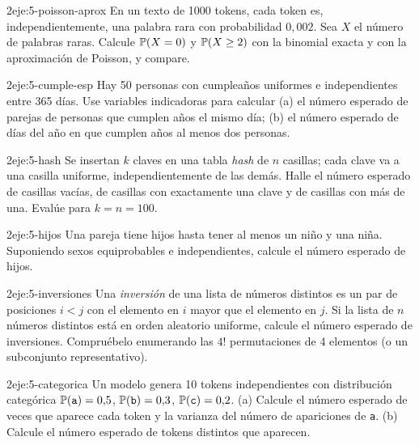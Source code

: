 \begin{ejercicio}{2}{eje:5-poisson-aprox}
En un texto de 1000 tokens, cada token es, independientemente, una palabra rara con probabilidad $0{,}002$. Sea $X$ el número de palabras raras. Calcule $\mathbb{P}(X=0)$ y $\mathbb{P}(X\ge2)$ con la binomial exacta y con la aproximación de Poisson, y compare.
\end{ejercicio}

\begin{ejercicio}{2}{eje:5-cumple-esp}
Hay 50 personas con cumpleaños uniformes e independientes entre 365 días. Use variables indicadoras para calcular (a) el número esperado de parejas de personas que cumplen años el mismo día; (b) el número esperado de días del año en que cumplen años al menos dos personas.
\end{ejercicio}

\begin{ejercicio}{2}{eje:5-hash}
Se insertan $k$ claves en una tabla \emph{hash} de $n$ casillas; cada clave va a una casilla uniforme, independientemente de las demás. Halle el número esperado de casillas vacías, de casillas con exactamente una clave y de casillas con más de una. Evalúe para $k=n=100$.
\end{ejercicio}

\begin{ejercicio}{2}{eje:5-hijos}
Una pareja tiene hijos hasta tener al menos un niño y una niña. Suponiendo sexos equiprobables e independientes, calcule el número esperado de hijos.
\end{ejercicio}

\begin{ejercicio}{2}{eje:5-inversiones}
Una \emph{inversión} de una lista de números distintos es un par de posiciones $i<j$ con el elemento en $i$ mayor que el elemento en $j$. Si la lista de $n$ números distintos está en orden aleatorio uniforme, calcule el número esperado de inversiones. Compruébelo enumerando las $4!$ permutaciones de 4 elementos (o un subconjunto representativo).
\end{ejercicio}

\begin{ejercicio}{2}{eje:5-categorica}
Un modelo genera 10 tokens independientes con distribución categórica $\mathbb{P}(\texttt{a})=0{,}5$, $\mathbb{P}(\texttt{b})=0{,}3$, $\mathbb{P}(\texttt{c})=0{,}2$. (a) Calcule el número esperado de veces que aparece cada token y la varianza del número de apariciones de \texttt{a}. (b) Calcule el número esperado de tokens distintos que aparecen.
\end{ejercicio}

